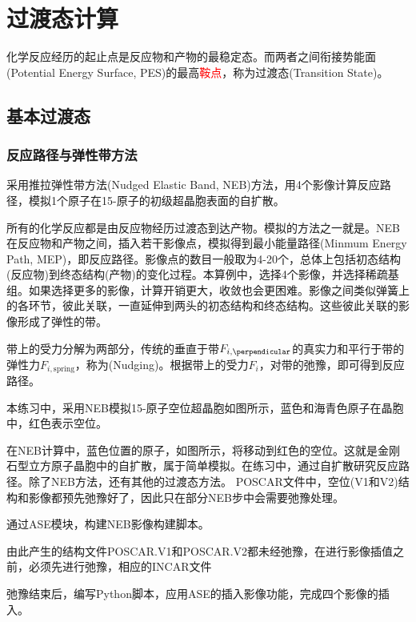 \section{过渡态计算}
化学反应经历的起止点是反应物和产物的最稳定态。而两者之间衔接势能面\textrm{(Potential Energy Surface, PES)}的最高\textcolor{red}{鞍点}，称为过渡态\textrm{(Transition State)}。

\subsection{基本过渡态}

\subsubsection{反应路径与弹性带方法}
采用推拉弹性带方法\textrm{(Nudged Elastic Band, NEB)}方法，用4个影像计算反应路径，模拟1个原子在15-原子的初级超晶胞表面的自扩散。

所有的化学反应都是由反应物经历过渡态到达产物。模拟的方法之一就是。\textrm{NEB}在反应物和产物之间，插入若干影像点，模拟得到最小能量路径\textrm{(Minmum Energy Path, MEP)}，即反应路径。影像点的数目一般取为4-20个，总体上包括初态结构(反应物)到终态结构(产物)的变化过程。本算例中，选择4个影像，并选择稀疏基组。如果选择更多的影像，计算开销更大，收敛也会更困难。影像之间类似弹簧上的各环节，彼此关联，一直延伸到两头的初态结构和终态结构。这些彼此关联的影像形成了弹性的带。

带上的受力分解为两部分，传统的垂直于带$F_{i,\perpendicular}$的真实力和平行于带的弹性力$F_{i,\mathrm{spring}}$，称为\textrm{(Nudging)}。根据带上的受力$F_i$，对带的弛豫，即可得到反应路径。

本练习中，采用\textrm{NEB}模拟15-原子空位超晶胞如图所示，蓝色和海青色原子在晶胞中，红色表示空位。

在\textrm{NEB}计算中，蓝色位置的原子，如图所示，将移动到红色的空位。这就是金刚石型立方原子晶胞中的自扩散，属于简单模拟。在练习中，通过自扩散研究反应路径。除了\textrm{NEB}方法，还有其他的过渡态方法。
\textrm{POSCAR}文件中，空位(\textrm{V1}和\textrm{V2})结构和影像都预先弛豫好了，因此只在部分\textrm{NEB}步中会需要弛豫处理。

通过\textrm{ASE}模块，构建\textrm{NEB}影像构建脚本。

由此产生的结构文件\textrm{POSCAR.V1}和\textrm{POSCAR.V2}都未经弛豫，在进行影像插值之前，必须先进行弛豫，相应的\textrm{INCAR}文件

弛豫结束后，编写\textrm{Python}脚本，应用\textrm{ASE}的插入影像功能，完成四个影像的插入。

